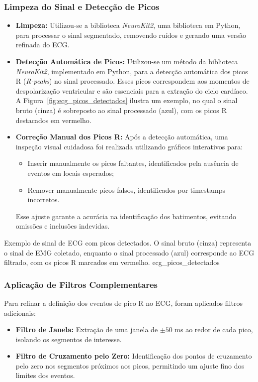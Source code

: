 \subsubsection{Limpeza do Sinal e Detecção de Picos}
\begin{itemize}
    \item \textbf{Limpeza:} Utilizou-se a biblioteca \textit{NeuroKit2}, uma biblioteca em Python, para processar o sinal segmentado, removendo ruídos e gerando uma versão refinada do ECG.
    \item \textbf{Detecção Automática de Picos:} Utilizou-se um método da biblioteca \textit{NeuroKit2}, implementado em Python, para a detecção automática dos picos R (\textit{R-peaks}) no sinal processado. Esses picos correspondem aos momentos de despolarização ventricular e são essenciais para a extração do ciclo cardíaco. A Figura~\ref{fig:ecg_picos_detectados} ilustra um exemplo, no qual o sinal bruto (cinza) é sobreposto ao sinal processado (azul), com os picos R destacados em vermelho.
    \item \textbf{Correção Manual dos Picos R:} Após a detecção automática, uma inspeção visual cuidadosa foi realizada utilizando gráficos interativos para:
    \begin{itemize}
        \item Inserir manualmente os picos faltantes, identificados pela ausência de eventos em locais esperados;
        \item Remover manualmente picos falsos, identificados por timestamps incorretos.
    \end{itemize}
    
    Esse ajuste garante a acurácia na identificação dos batimentos, evitando omissões e inclusões indevidas.
\end{itemize}


{Exemplo de sinal de ECG com picos detectados. O sinal bruto (cinza) representa o sinal de EMG coletado, enquanto o sinal processado (azul) corresponde ao ECG filtrado, com os picos R marcados em vermelho.}
{ecg_picos_detectados}


\subsubsection{Aplicação de Filtros Complementares}
Para refinar a definição dos eventos de pico R no ECG, foram aplicados filtros adicionais:
\begin{itemize}
    \item \textbf{Filtro de Janela:} Extração de uma janela de \(\pm50\) ms ao redor de cada pico, isolando os segmentos de interesse.
    \item \textbf{Filtro de Cruzamento pelo Zero:} Identificação dos pontos de cruzamento pelo zero nos segmentos próximos aos picos, permitindo um ajuste fino dos limites dos eventos.
\end{itemize}

